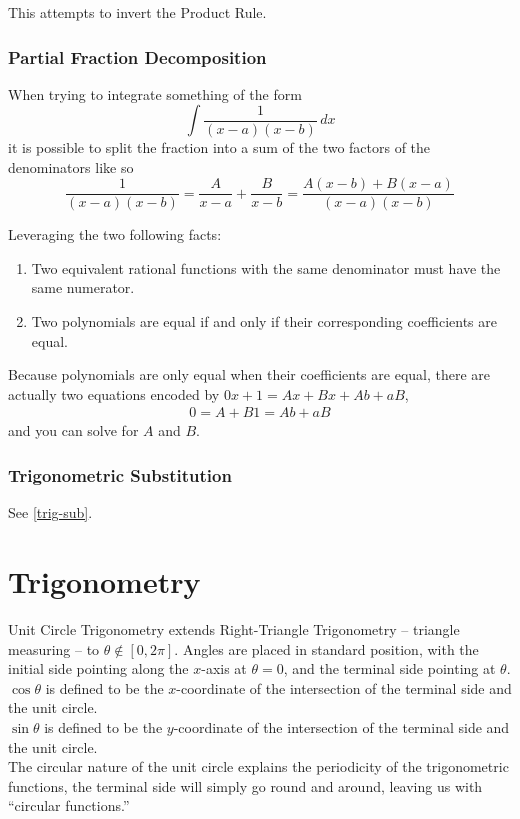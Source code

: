 \documentclass{article}
\begin{document}
This attempts to invert the Product Rule.

\subsubsection{Partial Fraction Decomposition}
When trying to integrate something of the form
$$\int\frac{1}{(x-a)(x-b)}\,dx$$
it is possible to split the fraction into a sum of the two factors of the denominators like so
$$\frac{1}{(x-a)(x-b)}=\frac{A}{x-a}+\frac{B}{x-b}=\frac{A(x-b)+B(x-a)}{(x-a)(x-b)}$$

Leveraging the two following facts:
\begin{enumerate}
    \item Two equivalent rational functions with the same denominator must have the same numerator.
    \item Two polynomials are equal if and only if their corresponding coefficients are equal.
\end{enumerate}
Because polynomials are only equal when their coefficients are equal, there are actually two equations encoded by $0x+1=Ax+Bx+Ab+aB$,
\begin{align*}
    0=A+B
    1=Ab+aB
\end{align*}
and you can solve for $A$ and $B$.

\subsubsection{Trigonometric Substitution}
See \ref{trig-sub}.

\section{Trigonometry}
Unit Circle Trigonometry extends Right-Triangle Trigonometry -- triangle measuring -- to $\theta \notin [0, 2\pi]$.
Angles are placed in standard position, with the initial side pointing along the $x$-axis at $\theta=0$, and the terminal side pointing at $\theta$.\\
$\cos{\theta}$ is defined to be the $x$-coordinate of the intersection of the terminal side and the unit circle.\\
$\sin{\theta}$ is defined to be the $y$-coordinate of the intersection of the terminal side and the unit circle.\\

The circular nature of the unit circle explains the periodicity of the trigonometric functions, the terminal side will simply go round and around, leaving us with ``circular functions.''
\end{document}
